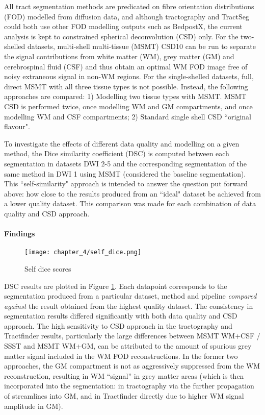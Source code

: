 All tract segmentation methods are predicated on fibre orientation distributions (FOD) modelled from diffusion data, and although tractography and TractSeg could both use other FOD modelling outputs such as BedpostX, the current analysis is kept to constrained spherical deconvolution (CSD) only.
For the two-shelled datasets, multi-shell multi-tissue (MSMT) CSD10 can be run to separate the signal contributions from white matter (WM), grey matter (GM) and cerebrospinal fluid (CSF) and thus obtain an optimal WM FOD image free of noisy extraneous signal in non-WM regions.
For the single-shelled datasets, full, direct MSMT with all three tissue types is not possible.
Instead, the following approaches are compared: 1) Modelling two tissue types with MSMT.
MSMT CSD is performed twice, once modelling WM and GM compartments, and once modelling WM and CSF compartments; 2) Standard single shell CSD ``original flavour".

To investigate the effects of different data quality and modelling on a given method, the Dice similarity coefficient (DSC) is computed between each segmentation in datasets DWI 2-5 and the corresponding segmentation of the same method in DWI 1 using MSMT (considered the baseline segmentation).
This ``self-similarity" approach is intended to answer the question put forward above: how close to the results produced from an ``ideal" dataset be achieved from a lower quality dataset.
This comparison was made for each combination of data quality and CSD approach.

\paragraph*{Findings}

\begin{figure}
  \texttt{[image: chapter\_4/self\_dice.png]}
  \caption{Self dice scores }
  \label{fig:self_dice}
\end{figure}

DSC results are plotted in Figure \ref{fig:self_dice}.
Each datapoint corresponds to the segmentation produced from a particular dataset, method and pipeline \textit{compared against} the result obtained from the highest quality dataset.
The consistency in segmentation results differed significantly with both data quality and CSD approach.
The high sensitivity to CSD approach in the tractography and Tractfinder results, particularly the large differences between MSMT WM+CSF / SSST and MSMT WM+GM, can be attributed to the amount of spurious grey matter signal included in the WM FOD reconstructions.
In the former two approaches, the GM compartment is not as aggressively suppressed from the WM reconstruction, resulting in WM ``signal” in grey matter areas (which is then incorporated into the segmentation: in tractography via the further propagation of streamlines into GM, and in Tractfinder directly due to higher WM signal amplitude in GM).

